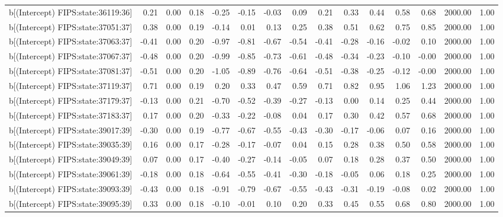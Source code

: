 \begin{table}[ht]
\begin{tabular}{rrrrrrrrrrrrrrr}
  b[(Intercept) FIPS:state:36119:36] & 0.21 & 0.00 & 0.18 & -0.25 & -0.15 & -0.03 & 0.09 & 0.21 & 0.33 & 0.44 & 0.58 & 0.68 & 2000.00 & 1.00 \\ 
  b[(Intercept) FIPS:state:37051:37] & 0.38 & 0.00 & 0.19 & -0.14 & 0.01 & 0.13 & 0.25 & 0.38 & 0.51 & 0.62 & 0.75 & 0.85 & 2000.00 & 1.00 \\ 
  b[(Intercept) FIPS:state:37063:37] & -0.41 & 0.00 & 0.20 & -0.97 & -0.81 & -0.67 & -0.54 & -0.41 & -0.28 & -0.16 & -0.02 & 0.10 & 2000.00 & 1.00 \\ 
  b[(Intercept) FIPS:state:37067:37] & -0.48 & 0.00 & 0.20 & -0.99 & -0.85 & -0.73 & -0.61 & -0.48 & -0.34 & -0.23 & -0.10 & -0.00 & 2000.00 & 1.00 \\ 
  b[(Intercept) FIPS:state:37081:37] & -0.51 & 0.00 & 0.20 & -1.05 & -0.89 & -0.76 & -0.64 & -0.51 & -0.38 & -0.25 & -0.12 & -0.00 & 2000.00 & 1.00 \\ 
  b[(Intercept) FIPS:state:37119:37] & 0.71 & 0.00 & 0.19 & 0.20 & 0.33 & 0.47 & 0.59 & 0.71 & 0.82 & 0.95 & 1.06 & 1.23 & 2000.00 & 1.00 \\ 
  b[(Intercept) FIPS:state:37179:37] & -0.13 & 0.00 & 0.21 & -0.70 & -0.52 & -0.39 & -0.27 & -0.13 & 0.00 & 0.14 & 0.25 & 0.44 & 2000.00 & 1.00 \\ 
  b[(Intercept) FIPS:state:37183:37] & 0.17 & 0.00 & 0.20 & -0.33 & -0.22 & -0.08 & 0.04 & 0.17 & 0.30 & 0.42 & 0.57 & 0.68 & 2000.00 & 1.00 \\ 
  b[(Intercept) FIPS:state:39017:39] & -0.30 & 0.00 & 0.19 & -0.77 & -0.67 & -0.55 & -0.43 & -0.30 & -0.17 & -0.06 & 0.07 & 0.16 & 2000.00 & 1.00 \\ 
  b[(Intercept) FIPS:state:39035:39] & 0.16 & 0.00 & 0.17 & -0.28 & -0.17 & -0.07 & 0.04 & 0.15 & 0.28 & 0.38 & 0.50 & 0.58 & 2000.00 & 1.00 \\ 
  b[(Intercept) FIPS:state:39049:39] & 0.07 & 0.00 & 0.17 & -0.40 & -0.27 & -0.14 & -0.05 & 0.07 & 0.18 & 0.28 & 0.37 & 0.50 & 2000.00 & 1.00 \\ 
  b[(Intercept) FIPS:state:39061:39] & -0.18 & 0.00 & 0.18 & -0.64 & -0.55 & -0.41 & -0.30 & -0.18 & -0.05 & 0.06 & 0.18 & 0.25 & 2000.00 & 1.00 \\ 
  b[(Intercept) FIPS:state:39093:39] & -0.43 & 0.00 & 0.18 & -0.91 & -0.79 & -0.67 & -0.55 & -0.43 & -0.31 & -0.19 & -0.08 & 0.02 & 2000.00 & 1.00 \\ 
  b[(Intercept) FIPS:state:39095:39] & 0.33 & 0.00 & 0.18 & -0.10 & -0.01 & 0.10 & 0.20 & 0.33 & 0.45 & 0.55 & 0.68 & 0.80 & 2000.00 & 1.00 \\ 

\end{tabular}
\end{table}
